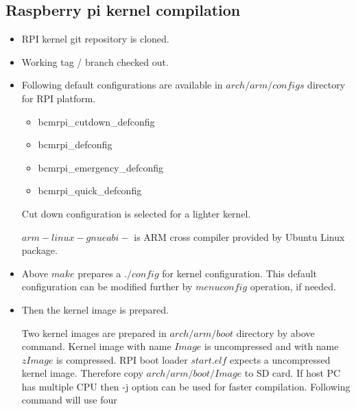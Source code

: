 \subsection {Raspberry pi kernel compilation}
\begin{itemize}
 \item RPI kernel git repository is cloned.\par
  \par
 \item Working tag / branch checked out.\par
  \par
 \item Following default configurations are available in
 $arch/arm/configs$ directory for RPI platform. 
 \begin{itemize}
 \item bcmrpi\_cutdown\_defconfig
 \item bcmrpi\_defconfig
 \item bcmrpi\_emergency\_defconfig
 \item bcmrpi\_quick\_defconfig
 \end{itemize}
 Cut down configuration is selected for a lighter
 kernel.\par
  \par
 $arm-linux-gnueabi-$ is ARM cross compiler provided by Ubuntu Linux package. 
 \item Above $make$ prepares a $./config$ for kernel configuration.
 This default configuration can be modified further by
 $menuconfig$ operation, if needed.\par
  \par
 \item Then the kernel image is prepared.\par
  \par
 Two kernel images are prepared in $arch/arm/boot$ directory by
 above command. Kernel image with name $Image$ is
 uncompressed and with name $zImage$ is compressed. RPI
 boot loader $start.elf$ expects a uncompressed kernel
 image. Therefore copy $arch/arm/boot/Image$ to SD card.
 If host PC has multiple CPU then -j option can be used
 for faster compilation. Following command will use four

\end{itemize}

